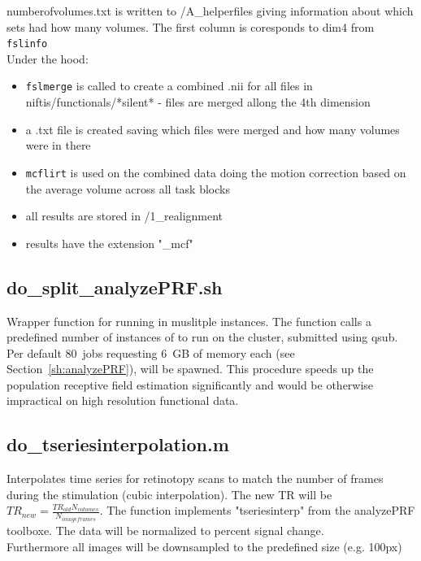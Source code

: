 \documentclass[12pt,a4paper]{scrartcl}
\begin{document}
\noindent numberofvolumes.txt is written to /A\_helperfiles giving information about which sets had how many volumes. The first column is coresponds to dim4 from \texttt{fslinfo}\\

\noindent Under the hood:
\begin{itemize}
\item \texttt{fslmerge} is called to create a combined .nii for all files in niftis/functionals/*silent* - files are merged allong the 4th dimension
\item a .txt file is created saving which files were merged and how many volumes were in there
\item \texttt{mcflirt} is used on the combined data doing the motion correction based on the average volume across all task blocks
\item all results are stored in /1\_realignment
\item results have the extension "\_mcf"
\end{itemize}

\subsection{do\_split\_analyzePRF.sh}
\label{sh:splitanalyzePRF}
Wrapper function for running \texttt{} in muslitple instances. The function calls a predefined number of instances of \texttt{} to run on the cluster, submitted using qsub. Per default 80~jobs requesting 6~GB of memory each (see Section~\ref{sh:analyzePRF}), will be spawned. This procedure speeds up the population receptive field estimation significantly and would be otherwise impractical on high resolution functional data.\\

\subsection{do\_tseriesinterpolation.m}
\label{m:tseriesinterp}
Interpolates time series for retinotopy scans to match the number of frames during the stimulation (cubic interpolation). The new TR will be $TR_{new}=\frac{TR_{old}N_{volumes}}{N_{imageframes}}$. The function implements "tseriesinterp" from the analyzePRF toolboxe. The data will be normalized to percent signal change.\\

\noindent Furthermore all images will be downsampled to the predefined size (e.g. 100px)\\
\end{document}
